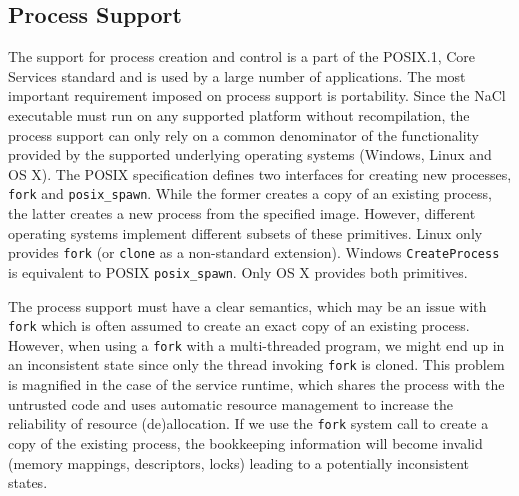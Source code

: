 
\subsection{Process Support}
\label{sub:process_support}

The support for process creation and control is a part of the POSIX.1,
Core Services standard and is used by a large number of applications.
The most important requirement imposed on process support is
portability. Since the NaCl executable must run on any supported
platform without recompilation, the process support can only rely on a
common denominator of the functionality provided by the supported
underlying operating systems (\ie Windows, Linux and OS X). The POSIX
specification defines two interfaces for creating new processes,
\lstinline`fork` and \lstinline`posix_spawn`. While the former creates a
copy of an existing process, the latter creates a new process from the
specified image.  However, different operating systems implement
different subsets of these primitives. Linux only provides
\lstinline`fork` (or \lstinline`clone` as a non-standard extension).
Windows \lstinline`CreateProcess` is equivalent to POSIX
\lstinline`posix_spawn`. Only OS X provides both primitives.

The process support must have a clear semantics, which may be an issue
with \lstinline`fork` which is often assumed to create an exact copy of
an existing process. However, when using a \lstinline`fork` with a
multi-threaded program, we might end up in an inconsistent state since
only the thread invoking \lstinline`fork` is cloned.  This problem is
magnified in the case of the service runtime, which shares the process
with the untrusted code and uses automatic resource management to
increase the reliability of resource (de)allocation. If we use the
\lstinline`fork` system call to create a copy of the existing process,
the bookkeeping information will become invalid (\eg memory mappings,
descriptors, locks) leading to a potentially inconsistent states.

